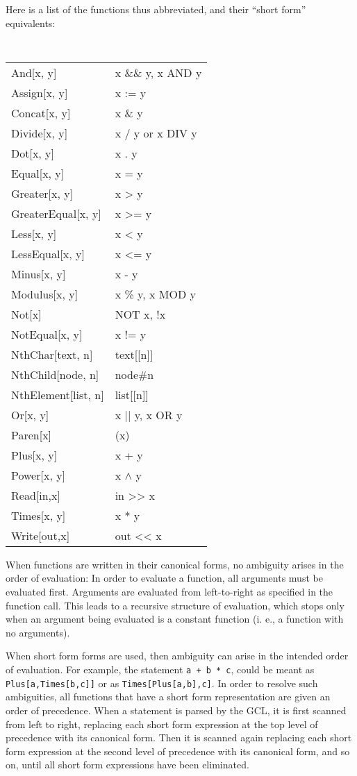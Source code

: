 Here is a list of the functions thus abbreviated, and their ``short form''
equivalents:

\medskip

{\tt
\begin{tabular}{lp{4in}}
And[x, y]		& x \&\& y, x AND y \\
Assign[x, y]		& x := y \\
Concat[x, y]            & x \& y \\
Divide[x, y]		& x / y or x DIV y \\
Dot[x, y]		& x . y \\
Equal[x, y]		& x = y \\
Greater[x, y]		& x > y \\
GreaterEqual[x, y]	& x >= y \\
Less[x, y]		& x < y \\
LessEqual[x, y]		& x <= y \\
Minus[x, y]		& x - y \\
Modulus[x, y]		& x \% y, x MOD y \\
Not[x]			& NOT x, !x \\
NotEqual[x, y]		& x != y \\
NthChar[text, n]	& text[[n]] \\
NthChild[node, n]	& node\#n \\ 
NthElement[list, n]	& list[[n]] \\
Or[x, y]		& x || y, x OR y \\
Paren[x]		& (x) \\ 
Plus[x, y]		& x + y \\
Power[x, y]	 	& x $\wedge$ y \\
Read[in,x]		& in >> x \\
Times[x, y]		& x * y \\
Write[out,x]		& out << x \\
\end{tabular}
}

When functions are written in their canonical forms, no ambiguity
arises in the order of evaluation: In order to evaluate a function,
all arguments must be evaluated first.  Arguments are evaluated from
left-to-right as specified in the function call.
This leads to a recursive structure of evaluation,
which stops only when an argument being evaluated is a constant
function (i. e., a function with no arguments).

When short form forms are used, then ambiguity can arise in the
intended order of evaluation.  For example, the statement \verb&a + b * c&,
could be meant as \verb+Plus[a,Times[b,c]]+ or as
\verb+Times[Plus[a,b],c]+.  In order to resolve such ambiguities, all
functions that have a short form representation are given an order of
precedence.  When a statement is parsed by the GCL, it is first
scanned from left to right, replacing each short form expression at the
top level of precedence with its canonical form.  Then it is scanned
again replacing each short form expression at the second level of
precedence with its canonical form, and so on, until all short form
expressions have been eliminated.  

